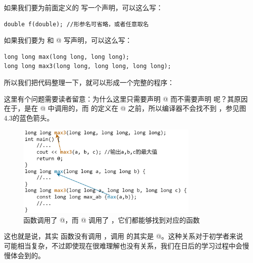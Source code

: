 如果我们要为前面定义的 \lstinline@f@ 写一个声明，可以这么写：
\begin{lstlisting}
double f(double); //形参名可省略，或者任意取名
\end{lstlisting}
如果我们要为 \lstinline@max@ 和 @ 写声明，可以这么写：
\begin{lstlisting}
long long max(long long, long long); 
long long max3(long long, long long, long long);
\end{lstlisting}\par
所以我们把代码整理一下，就可以形成一个完整的程序：
\par
这里有个问题需要读者留意：为什么这里只需要声明 @ 而不需要声明 \lstinline@max@ 呢？其原因在于，\lstinline@max@ 是在 @ 中调用的，而 \lstinline@max@ 的定义在 @ 之前，所以编译器不会找不到 \lstinline@max@，参见图4.3的蓝色箭头。\par
\begin{figure}[htbp]
    \centering
    \includegraphics[width=0.8\textwidth]{../images/generalized_parts/04_max3_code_logic.drawio.png}
    \caption{\lstinline@main@ 函数调用了 @，而 @ 调用了 \lstinline@max@，它们都能够找到对应的函数}
\end{figure}
这也就是说，其实 \lstinline@main@ 函数没有调用 \lstinline@max@，调用 \lstinline@max@ 的其实是 @。这种关系对于初学者来说可能相当复杂，不过即使现在很难理解也没有关系，我们在日后的学习过程中会慢慢体会到的。\par
